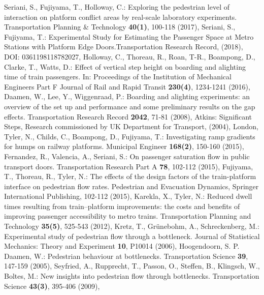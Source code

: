 \begin{thebibliography}{1}
    Seriani, S., Fujiyama, T., Holloway, C.: Exploring the pedestrian level of interaction on platform conflict areas by real-scale laboratory experiments. Transportation Planning \& Technology \textbf{40(1)}, 100-118 (2017), 
    Seriani, S., Fujiyama, T.: Experimental Study for Estimating the Passenger Space at Metro Stations with Platform Edge Doors.Transportation Research Record, (2018), DOI: 0361198118782027,
    Holloway, C., Thoreau, R., Roan, T-R., Boampong, D., Clarke, T., Watts, D.: Effect of vertical step height on boarding and alighting time of train passengers. In: Proceedings of the Institution of Mechanical Engineers Part F Journal of Rail and Rapid Transit \textbf{230(4)}, 1234-1241 (2016), 
    Daamen, W., Lee, Y., Wiggenraad, P.: Boarding and alighting experiments: an overview of the set up and performance and some preliminary results on the gap effects. Transportation Research Record \textbf{2042}, 71-81 (2008), 
    Atkins: Significant Steps, Research commissioned by UK Department for Transport, (2004), London,
    Tyler, N., Childs, C., Boampong, D., Fujiyama, T.: Investigating ramp gradients for humps on railway platforms. Municipal Engineer \textbf{168(2)}, 150-160 (2015),    
    Fernandez, R., Valencia, A., Seriani, S.: On passenger saturation flow in public transport doors. Transportation Research Part A \textbf{78}, 102-112 (2015), 
    Fujiyama, T., Thoreau, R., Tyler, N.: The effects of the design factors of the train-platform interface on pedestrian flow rates. Pedestrian and Evacuation Dynamics, Springer International Publishing, 102-112 (2015), 
    Karekla, X., Tyler, N.: Reduced dwell times resulting from train–platform improvements: the costs and benefits of improving passenger accessibility to metro trains. Transportation Planning and Technology \textbf{35(5)}, 525-543 (2012), 
    Kretz, T., Grünebohm, A., Schreckenberg, M.: Experimental study of pedestrian flow through a bottleneck. Journal of Statistical Mechanics: Theory and Experiment \textbf{10}, P10014 (2006),
    Hoogendoorn, S. P. Daamen, W.: Pedestrian behaviour at bottlenecks. Transportation Science \textbf{39}, 147-159 (2005),
    Seyfried, A., Rupprecht, T., Passon, O., Steffen, B., Klingsch, W., Boltes, M.: New insights into pedestrian flow through bottlenecks. Transportation Science \textbf{43(3)}, 395-406 (2009),

\end{thebibliography}
